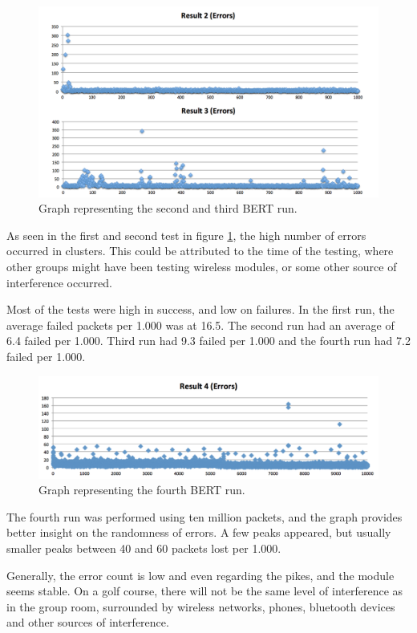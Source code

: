 \begin{figure}[h!]
\hspace*{-2cm}
\includegraphics[width=1.3\textwidth]{chapters/test/figures/res5.png}
\caption{Graph representing the second and third BERT run.}
\label{fig:bert2}
\end{figure}

As seen in the first and second test in figure \ref{fig:bert2}, the high number of errors occurred in clusters. This could be attributed to the time of the testing, where other groups might have been testing wireless modules, or some other source of interference occurred.

Most of the tests were high in success, and low on failures. In the first run, the average failed packets per 1.000 was at 16.5. The second run had an average of 6.4 failed per 1.000. Third run had 9.3 failed per 1.000 and the fourth run had 7.2 failed per 1.000.


\begin{figure}[h!]
\hspace*{-2cm}
\includegraphics[width=1.3\textwidth]{chapters/test/figures/res4.png}
\caption{Graph representing the fourth BERT run.}
\label{fig:bert3}
\end{figure}

The fourth run was performed using ten million packets, and the graph provides better insight on the randomness of errors. A few peaks appeared, but usually smaller peaks between 40 and 60 packets lost per 1.000.

Generally, the error count is low and even regarding the pikes, and the module seems stable. On a golf course, there will not be the same level of interference as in the group room, surrounded by wireless networks, phones, bluetooth devices and other sources of interference.

